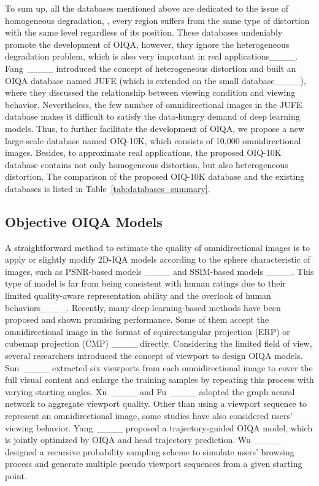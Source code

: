 To sum up, all the databases mentioned above are dedicated to the issue of homogeneous degradation, \ie, every region suffers from the same type of distortion with the same level regardless of its position. These databases undeniably promote the development of OIQA, however, they ignore the heterogeneous degradation problem, which is also very important in real applications____. Fang~\et____ introduced the concept of heterogeneous distortion and built an OIQA database named JUFE (which is extended on the small database____), where they discussed the relationship between viewing condition and viewing behavior. Nevertheless, the few number of omnidirectional images in the JUFE database makes it difficult to satisfy the data-hungry demand of deep learning models. Thus, to further facilitate the development of OIQA, we propose a new large-scale database named OIQ-10K, which consists of 10,000 omnidirectional images. Besides, to approximate real applications, the proposed OIQ-10K database contains not only homogeneous distortion, but also heterogeneous distortion. The comparison of the proposed OIQ-10K database and the existing databases is listed in Table~\ref{tab:databases_summary}.


\subsection{Objective OIQA Models}
\label{subsec:oiqa_method}

A straightforward method to estimate the quality of omnidirectional images is to apply or slightly modify 2D-IQA models according to the sphere characteristic of images, such as PSNR-based models ____ and SSIM-based models ____. This type of model is far from being consistent with human ratings due to their limited quality-aware representation ability and the overlook of human behaviors____. Recently, many deep-learning-based methods have been proposed and shown promising performance. Some of them accept the omnidirectional image in the format of equirectangular projection (ERP) or cubemap projection (CMP) ____ directly. Considering the limited field of view, several researchers introduced the concept of viewport to design OIQA models. Sun~\et____ extracted six viewports from each omnidirectional image to cover the full visual content and enlarge the training samples by repeating this process with varying starting angles. Xu~\et____ and Fu~\et____ adopted the graph neural network to aggregate viewport quality. Other than using a viewport sequence to represent an omnidirectional image, some studies have also considered users' viewing behavior. Yang~\et____ proposed a trajectory-guided OIQA model, which is jointly optimized by OIQA and head trajectory prediction. Wu~\et____ designed a recursive probability sampling scheme to simulate users' browsing process and generate multiple pseudo viewport sequences from a given starting point.

